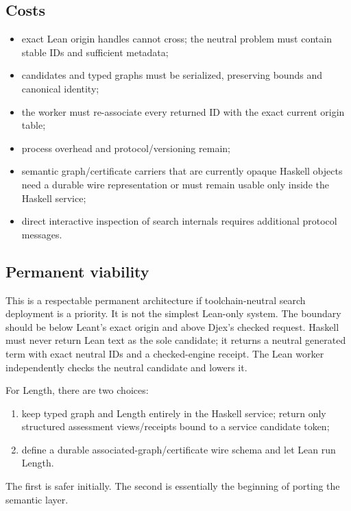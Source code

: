 \documentclass[10pt,letterpaper,oneside]{report}
\begin{document}
\subsection{Costs}

\begin{itemize}
  \item exact Lean origin handles cannot cross; the neutral problem must contain stable IDs and sufficient metadata;
  \item candidates and typed graphs must be serialized, preserving bounds and canonical identity;
  \item the worker must re-associate every returned ID with the exact current origin table;
  \item process overhead and protocol/versioning remain;
  \item semantic graph/certificate carriers that are currently opaque Haskell objects need a durable wire representation or must remain usable only inside the Haskell service;
  \item direct interactive inspection of search internals requires additional protocol messages.
\end{itemize}

\subsection{Permanent viability}

This is a respectable permanent architecture if toolchain-neutral search deployment is a priority. It is not the simplest Lean-only system. The boundary should be below Leant's exact origin and above Djex's checked request. Haskell must never return Lean text as the sole candidate; it returns a neutral generated term with exact neutral IDs and a checked-engine receipt. The Lean worker independently checks the neutral candidate and lowers it.

For Length, there are two choices:

\begin{enumerate}
  \item keep typed graph and Length entirely in the Haskell service; return only structured assessment views/receipts bound to a service candidate token;
  \item define a durable associated-graph/certificate wire schema and let Lean run Length.
\end{enumerate}

The first is safer initially. The second is essentially the beginning of porting the semantic layer.
\end{document}
